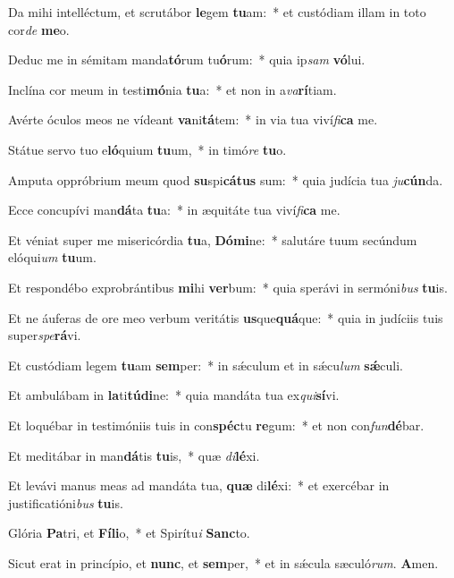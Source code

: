 ﻿\item Da mihi intelléctum, et scrutábor \textbf{le}gem \textbf{tu}am:~* et custódiam illam in toto cor\emph{de} \textbf{me}o.
\item Deduc me in sémitam manda\textbf{tó}rum tu\textbf{ó}rum:~* quia ip\emph{sam} \textbf{vó}lui.
\item Inclína cor meum in testi\textbf{mó}nia \textbf{tu}a:~* et non in a\emph{va}\textbf{rí}tiam.
\item Avérte óculos meos ne vídeant \textbf{va}ni\textbf{tá}tem:~* in via tua viví\emph{fi}\textbf{ca} me.
\item Státue servo tuo e\textbf{ló}quium \textbf{tu}um,~* in timó\emph{re} \textbf{tu}o.
\item Amputa oppróbrium meum quod \textbf{su}spi\textbf{cá}\textbf{tus} sum:~* quia judícia tua \emph{ju}\textbf{cún}da.
\item Ecce concupívi man\textbf{dá}ta \textbf{tu}a:~* in æquitáte tua viví\emph{fi}\textbf{ca} me.
\item Et véniat super me misericórdia \textbf{tu}a, \textbf{Dó}\textbf{mi}ne:~* salutáre tuum secúndum elóqui\emph{um} \textbf{tu}um.
\item Et respondébo exprobrántibus \textbf{mi}hi \textbf{ver}bum:~* quia sperávi in sermóni\emph{bus} \textbf{tu}is.
\item Et ne áuferas de ore meo verbum veritátis \textbf{us}que\textbf{quá}que:~* quia in judíciis tuis super\emph{spe}\textbf{rá}vi.
\item Et custódiam legem \textbf{tu}am \textbf{sem}per:~* in sǽculum et in sǽcu\emph{lum} \textbf{sǽ}culi.
\item Et ambulábam in \textbf{la}ti\textbf{tú}\textbf{di}ne:~* quia mandáta tua ex\emph{qui}\textbf{sí}vi.
\item Et loquébar in testimóniis tuis in con\textbf{spéc}tu \textbf{re}gum:~* et non con\emph{fun}\textbf{dé}bar.
\item Et meditábar in man\textbf{dá}tis \textbf{tu}is,~* quæ \emph{di}\textbf{lé}xi.
\item Et levávi manus meas ad mandáta tua, \textbf{quæ} di\textbf{lé}xi:~* et exercébar in justificatióni\emph{bus} \textbf{tu}is.
\item Glória \textbf{Pa}tri, et \textbf{Fí}\textbf{li}o,~* et Spirítu\emph{i} \textbf{Sanc}to.
\item Sicut erat in princípio, et \textbf{nunc}, et \textbf{sem}per,~* et in sǽcula sæculó\emph{rum}. \textbf{A}men.